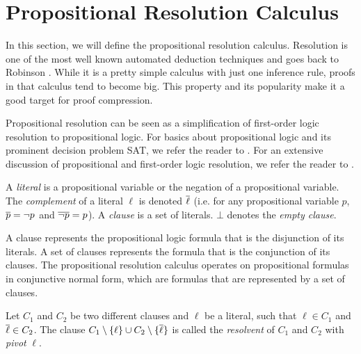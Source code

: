 \section{Propositional Resolution Calculus}
\label{sec:resolution}

In this section, we will define the propositional resolution calculus.
Resolution is one of the most well known automated deduction techniques and goes back to Robinson \cite{Robinson1965}.
While it is a pretty simple calculus with just one inference rule, proofs in that calculus tend to become big.
This property and its popularity make it a good target for proof compression.

Propositional resolution can be seen as a simplification of first-order logic resolution to propositional logic.
For basics about propositional logic and its prominent decision problem SAT, we refer the reader to \cite{Biere2009}.
For an extensive discussion of propositional and first-order logic resolution, we refer the reader to \cite{Leitsch1997}.

\begin{definition}

A \emph{literal} is a propositional variable or the negation of a propositional variable. 
The \emph{complement} of a literal $\ell$ is denoted $\overline{\ell}$ (i.e. for any propositional variable $p$,
$\overline{p} = \neg p$ and $\overline{\neg p} = p$). 
A \emph{clause} is a set of literals. 
$\bot$ denotes the \emph{empty clause}.

\end{definition}

A clause represents the propositional logic formula that is the disjunction of its literals.
A set of clauses represents the formula that is the conjunction of its clauses.
The propositional resolution calculus operates on propositional formulas in conjunctive normal form, which are formulas that are represented by a set of clauses.

\begin{definition}[Resolvent]

Let $C_1$ and $C_2$ be two different clauses and $\ell$ be a literal, such that $\ell \in C_1$ and $\overline{\ell} \in C_2$.
The clause $C_1 \setminus \{\ell\} \cup C_2 \setminus \{\overline{\ell}\}$ is called the \emph{resolvent} of $C_1$ and $C_2$ with \emph{pivot} $\ell$.

\end{definition}

